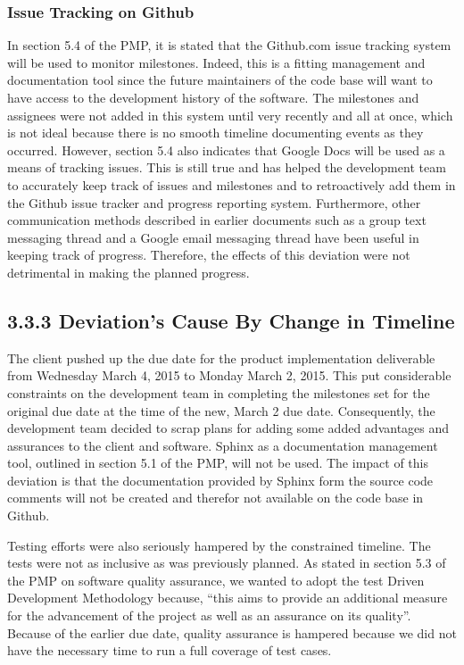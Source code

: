 \documentclass[]{article}
\begin{document}
\subsubsection{Issue Tracking on Github}\label{issue-tracking-on-github}

In section 5.4 of the PMP, it is stated that the Github.com issue
tracking system will be used to monitor milestones. Indeed, this is a
fitting management and documentation tool since the future maintainers
of the code base will want to have access to the development history of
the software. The milestones and assignees were not added in this system
until very recently and all at once, which is not ideal because there is
no smooth timeline documenting events as they occurred. However, section
5.4 also indicates that Google Docs will be used as a means of tracking
issues. This is still true and has helped the development team to
accurately keep track of issues and milestones and to retroactively add
them in the Github issue tracker and progress reporting system.
Furthermore, other communication methods described in earlier documents
such as a group text messaging thread and a Google email messaging
thread have been useful in keeping track of progress. Therefore, the
effects of this deviation were not detrimental in making the planned
progress.

\subsection{\textbf{3.3.3 Deviation's Cause By Change in
Timeline}}\label{deviations-cause-by-change-in-timeline}

The client pushed up the due date for the product implementation
deliverable from Wednesday March 4, 2015 to Monday March 2, 2015. This
put considerable constraints on the development team in completing the
milestones set for the original due date at the time of the new, March 2
due date. Consequently, the development team decided to scrap plans for
adding some added advantages and assurances to the client and software.
Sphinx as a documentation management tool, outlined in section 5.1 of
the PMP, will not be used. The impact of this deviation is that the
documentation provided by Sphinx form the source code comments will not
be created and therefor not available on the code base in Github.

Testing efforts were also seriously hampered by the constrained
timeline. The tests were not as inclusive as was previously planned. As
stated in section 5.3 of the PMP on software quality assurance, we
wanted to adopt the test Driven Development Methodology because, ``this
aims to provide an additional measure for the advancement of the project
as well as an assurance on its quality''. Because of the earlier due
date, quality assurance is hampered because we did not have the
necessary time to run a full coverage of test cases.
\end{document}
